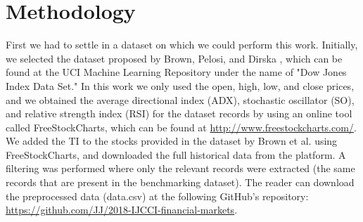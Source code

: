 \documentclass[a4paper,twoside]{article}
\begin{document}



\section{Methodology}
\label{proposed-method}


First we had to settle in a dataset on which we could perform this
work. Initially, we selected the dataset proposed  by Brown, Pelosi, and
Dirska \cite{brown2013dynamic}, which can be found at the UCI Machine
Learning Repository under the name of "Dow Jones Index Data Set." %
In
this work we only used the open, high, low, and close prices, and we
obtained the average directional index (ADX), stochastic oscillator
(SO), and relative strength index (RSI) for the dataset records by
using an online tool called FreeStockCharts, which can be found at
\url{http://www.freestockcharts.com/}. We added the TI to the stocks
provided in the dataset by Brown et al. using FreeStockCharts, and
downloaded the full historical data from the platform. A filtering was
performed where only the relevant records were extracted (the same
records that are present in the benchmarking dataset). The reader can
download the preprocessed data (data.csv) at the following GitHub's
repository: \url{https://github.com/JJ/2018-IJCCI-financial-markets}. %
\end{document}
